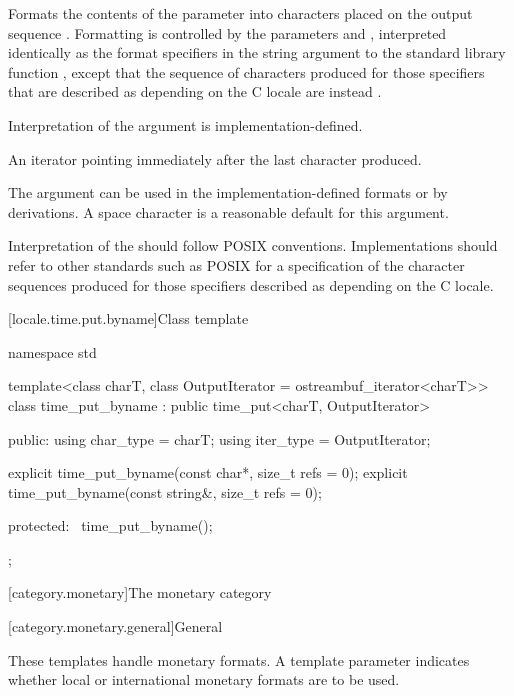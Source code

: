 \begin{itemdescr}
\pnum
\effects
Formats the contents of the parameter 
into characters placed on the output sequence .
Formatting is controlled by the parameters  and ,
interpreted identically as the format specifiers
in the string argument to the standard library function
%
,
except that the sequence of characters produced for those specifiers
that are described as depending on the C locale
are instead
.
\begin{note}
Interpretation of the  argument is implementation-defined.
\end{note}

\pnum
\returns
An iterator pointing immediately after the last character produced.
\begin{note}
The  argument can be used
in the implementation-defined formats or by derivations.
A space character is a reasonable default for this argument.
\end{note}

\pnum
\recommended
Interpretation of the  should follow POSIX conventions.
Implementations should refer to other standards such as POSIX
for a specification of the character sequences produced for
those specifiers described as depending on the C locale.
\end{itemdescr}

[locale.time.put.byname]{Class template }

%
\begin{codeblock}
namespace std {
  template<class charT, class OutputIterator = ostreambuf_iterator<charT>>
    class time_put_byname : public time_put<charT, OutputIterator> {
    public:
      using char_type = charT;
      using iter_type = OutputIterator;

      explicit time_put_byname(const char*, size_t refs = 0);
      explicit time_put_byname(const string&, size_t refs = 0);

    protected:
      ~time_put_byname();
    };
}
\end{codeblock}

[category.monetary]{The monetary category}

[category.monetary.general]{General}

\pnum
These templates handle monetary formats.
A template parameter indicates
whether local or international monetary formats are to be used.

